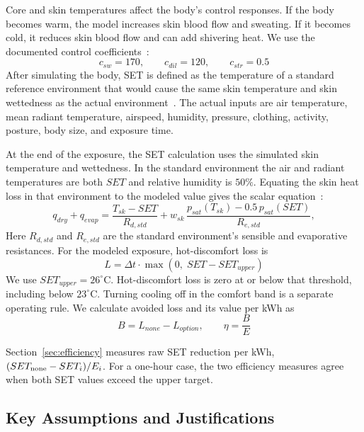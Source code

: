 Core and skin temperatures affect the body's control responses. If the body becomes warm, the model increases skin blood flow and sweating. If it becomes cold, it reduces skin blood flow and can add shivering heat. We use the documented control coefficients~\cite{comf_0112_set}:
\begin{equation}
c_{sw} = 170, \qquad c_{dil} = 120, \qquad c_{str} = 0.5
\end{equation}
After simulating the body, SET is defined as the temperature of a standard reference environment that would cause the same skin temperature and skin wettedness as the actual environment~\cite{ashrae_thermal_comfort_2025}. The actual inputs are air temperature, mean radiant temperature, airspeed, humidity, pressure, clothing, activity, posture, body size, and exposure time.
 
At the end of the exposure, the SET calculation uses the simulated skin temperature and wettedness. In the standard environment the air and radiant temperatures are both $SET$ and relative humidity is $50\%$. Equating the skin heat loss in that environment to the modeled value gives the scalar equation~\cite{ashrae_thermal_comfort_2025,comf_0112_set}:
\begin{equation}
 q_{dry}+q_{evap}=
 \frac{T_{sk}-SET}{R_{d,std}}
 +w_{sk}\,\frac{p_{sat}(T_{sk})-0.5\,p_{sat}(SET)}{R_{e,std}},
\end{equation}
Here $R_{d,std}$ and $R_{e,std}$ are the standard environment's sensible and evaporative resistances. For the modeled exposure, hot-discomfort loss is
\begin{equation}
L = \Delta t \cdot \max\left(0,\; SET - SET_{upper}\right)
\end{equation}
We use $SET_{upper}=26^\circ$C. Hot-discomfort loss is zero at or below that threshold, including below $23^\circ$C. Turning cooling off in the comfort band is a separate operating rule. We calculate avoided loss and its value per kWh as
\begin{equation}
B = L_{none} - L_{option}, \qquad \eta = \frac{B}{E}
\end{equation}
 
Section~\ref{sec:efficiency} measures raw SET reduction per kWh, $(SET_{\rm none}-SET_i)/E_i$. For a one-hour case, the two efficiency measures agree when both SET values exceed the upper target.

\subsection[Key Assumptions]{Key Assumptions and Justifications}
 
